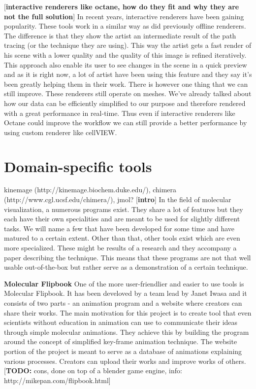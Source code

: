 \documentclass[
  digital, %
  table,   %
  nolof,     %
  nolot,     %
]{fithesis3}
\begin{document}
[\textbf{interactive renderers like octane, how do they fit and why they are not the full solution}]
In recent years, interactive renderers have been gaining popularity. These tools work in a similar way as did previously offline renderers. The difference is that they show the artist an intermediate result of the path tracing (or the technique they are using). This way the artist gets a fast render of his scene with a lower quality and the quality of this image is refined iteratively. This approach also enable its user to see changes in the scene in a quick preview and as it is right now, a lot of artist have been using this feature and they say it's been greatly helping them in their work. There is however one thing that we can still improve. These renderers still operate on meshes. We've already talked about how our data can be efficiently simplified to our purpose and therefore rendered with a great performance in real-time. Thus even if interactive renderers like Octane could improve the workflow we can still provide a better performance by using custom renderer like cellVIEW.

\section{Domain-specific tools}
kinemage (http://kinemage.biochem.duke.edu/), chimera (http://www.cgl.ucsf.edu/chimera/), jmol?
[\textbf{intro}]
In the field of molecular visualization, a numerous programs exist. They share a lot of features but they each have their own specialities and are meant to be used for slightly different tasks. We will name a few that have been developed for some time and have matured to a certain extent. Other than that, other tools exist which are even more specialized. These might be results of a research and they accompany a paper describing the technique. This means that these programs are not that well usable out-of-the-box but rather serve as a demonstration of a certain technique.

\textbf{Molecular Flipbook}
One of the more user-friendlier and easier to use tools is Molecular Flipbook. It has been develoved by a team lead by Janet Iwasa and it consists of two parts - an animation program and a website where creators can share their works. The main motivation for this project is to create tool that even scientists without education in animation can use to communicate their ideas through simple molecular animations. They achieve this by building the program around the concept of simplified key-frame animation technique. The website portion of the project is meant to serve as a database of animations explaining various processes. Creators can upload their works and improve works of others.
[\textbf{TODO:} cons, done on top of a blender game engine, info: http://mikepan.com/flipbook.html]
\end{document}
